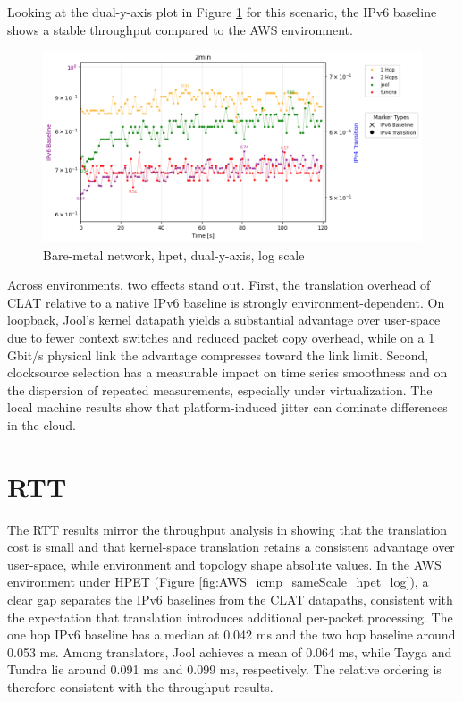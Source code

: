 Looking at the dual-y-axis plot in Figure \ref{fig:Double_tcp_dualAxis_hpet_log} for this scenario, the IPv6 baseline shows a stable throughput compared to the AWS environment.
\begin{figure}[H]
    \centering
    \includegraphics[width=1\textwidth]{resources/finalPlots/Jitterplots/LocalDouble_tcp_dualAxis_hpet_2min_log.png}
    \caption{Bare-metal network, hpet, dual-y-axis, log scale}
    \label{fig:Double_tcp_dualAxis_hpet_log}
\end{figure}

Across environments, two effects stand out. First, the translation overhead of CLAT relative to a native IPv6 baseline is strongly environment-dependent. On loopback, Jool’s kernel datapath yields a substantial advantage over user-space due to fewer context switches and reduced packet copy overhead, while on a 1 Gbit/s physical link the advantage compresses toward the link limit. Second, clocksource selection has a measurable impact on time series smoothness and on the dispersion of repeated measurements, especially under virtualization. The local machine results show that platform-induced jitter can dominate differences in the cloud.

\section{RTT}
The RTT results mirror the throughput analysis in showing that the translation cost is small and that kernel-space translation retains a consistent advantage over user-space, while environment and topology shape absolute values. In the AWS environment under HPET (Figure \ref{fig:AWS_icmp_sameScale_hpet_log}), a clear gap separates the IPv6 baselines from the CLAT datapaths, consistent with the expectation that translation introduces additional per-packet processing. The one hop IPv6 baseline has a median at 0.042 ms and the two hop baseline around 0.053 ms. Among translators, Jool achieves a mean of 0.064 ms, while Tayga and Tundra lie around 0.091 ms and 0.099 ms, respectively. The relative ordering is therefore consistent with the throughput results.


